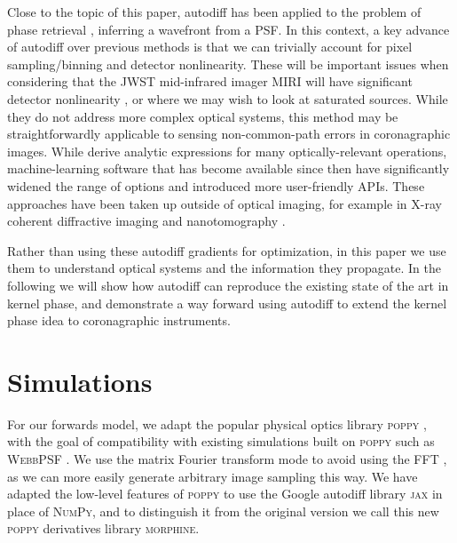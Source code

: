 \documentclass[modern]{aastex63}
\begin{document}
Close to the topic of this paper, autodiff has been applied to the problem of phase retrieval \citep{jurling14,paine19}, inferring a wavefront from a PSF. In this context, a key advance of autodiff over previous methods is that we can trivially account for pixel sampling/binning and detector nonlinearity. These will be important issues when considering that the JWST mid-infrared imager MIRI will have significant detector nonlinearity \citep{rieke15}, or where we may wish to look at saturated sources.  While they do not address more complex optical systems, this method may be straightforwardly applicable to sensing non-common-path errors in coronagraphic images. While \citet{jurling14} derive analytic expressions for many optically-relevant operations, machine-learning software that has become available since then have significantly widened the range of options and introduced more user-friendly APIs. These approaches have been taken up outside of optical imaging, for example in X-ray coherent diffractive imaging \citep{kandel19,nashed19} and nanotomography \citep{Dueaay3700}.

Rather than using these autodiff gradients for optimization, in this paper we use them to understand optical systems and the information they propagate.
In the following we will show how autodiff can reproduce the existing state of the art in kernel phase, and demonstrate a way forward using autodiff to extend the kernel phase idea to coronagraphic instruments.

\section{Simulations}
\label{sec:method}

For our forwards model, we adapt the popular physical optics library \textsc{poppy} \citep{poppy}, with the goal of compatibility with existing simulations built on \textsc{poppy} such as \textsc{WebbPSF} \citep{webbpsf}. We use the matrix Fourier transform mode to avoid using the FFT \citep{soummer07}, as we can more easily generate arbitrary image sampling this way. We have adapted the low-level features of \textsc{poppy} to use the Google autodiff library \textsc{jax} \citep{jax} in place of \textsc{NumPy}, and to distinguish it from the original version we call this new \textsc{poppy} derivatives library \textsc{morphine}. %
\end{document}
